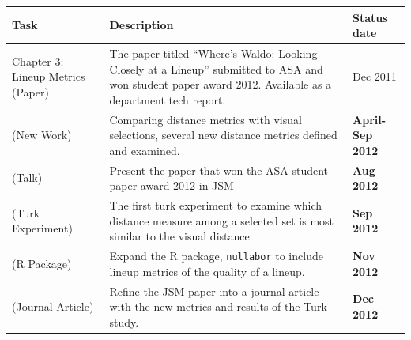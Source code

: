\documentclass{beamer}
\begin{document}
\begin{frame}
\vspace{-0.5cm}
\begin{table}[hbtp]
\small
\centering 
\begin{tabular}{|p{2.5cm}|p{6cm}|l|} 
\hline
Task &  Description & Status date\\ %
\hline
Chapter 3: Lineup Metrics (Paper) & The paper titled ``Where's Waldo: Looking Closely at a Lineup'' submitted to ASA and won student paper award 2012. Available as a department tech report.  & Dec 2011 \\
(New Work) & Comparing distance metrics with visual selections, several new distance metrics defined and examined. & {\bf April-Sep 2012}\\
(Talk) & Present the paper that won the ASA student paper award 2012 in JSM  & {\bf Aug 2012}\\
(Turk Experiment) & The first turk experiment to examine which distance measure among a selected set is most similar to the visual distance  & {\bf Sep 2012} \\
(R Package)  & Expand the R package, {\tt nullabor} to include lineup metrics of the quality of a lineup. & {\bf Nov 2012}\\
(Journal Article) & Refine the JSM paper into a journal article with the new metrics and results of the Turk study. & {\bf Dec 2012}\\ \hline
\end{tabular}
\label{tbl:tjob}
\end{table}

\end{frame}
\end{document}

